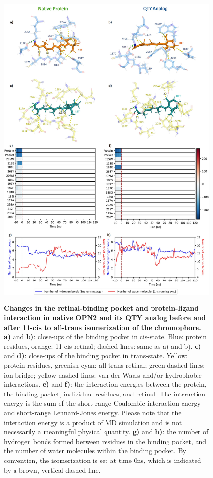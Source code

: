 \documentclass[fleqn, 10pt, lineno]{manuscript}
\begin{document}
\begin{figure}[htbp]
	\centering
	\includegraphics[width=\linewidth]{Figures/function-binding.jpg}
\end{figure}

\begin{figure}[htbp]
	\caption{\textbf{Changes in the retinal-binding pocket and protein-ligand interaction in native OPN2 and its QTY analog before and after 11-cis to all-trans isomerization of the chromophore. } \textbf{a)} and \textbf{b)}: close-ups of the binding pocket in cis-state. Blue: protein residues, orange: 11-cis-retinal; dashed lines: same as a) and b). \textbf{c)} and \textbf{d)}: close-ups of the binding pocket in trans-state. Yellow: protein residues, greenish cyan: all-trans-retinal; green dashed lines: ion bridge; yellow dashed lines: van der Waals and/or hydrophobic interactions. \textbf{e)} and \textbf{f)}: the interaction energies between the protein, the binding pocket, individual residues, and retinal. The interaction energy is the sum of the short-range Coulombic interaction energy and short-range Lennard-Jones energy. Please note that the interaction energy is a product of MD simulation and is not necessarily a meaningful physical quantity. \textbf{g)} and \textbf{h)}: the number of hydrogen bonds formed between residues in the binding pocket, and the number of water molecules within the binding pocket. By convention, the isomerization is set at time 0ns, which is indicated by a brown, vertical dashed line. }
	\label{fig:binding}
\end{figure}
\end{document}
